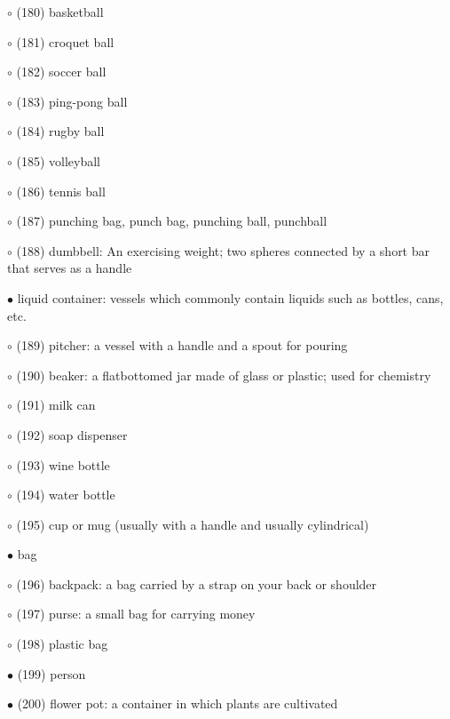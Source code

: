 \noindent \leftskip=0.5cm $\circ$ (180) basketball

\noindent \leftskip=0.5cm $\circ$ (181) croquet ball

\noindent \leftskip=0.5cm $\circ$ (182) soccer ball

\noindent \leftskip=0.5cm $\circ$ (183) ping-pong ball

\noindent \leftskip=0.5cm $\circ$ (184) rugby ball

\noindent \leftskip=0.5cm $\circ$ (185) volleyball

\noindent \leftskip=0.5cm $\circ$ (186) tennis ball

\noindent \leftskip=0.25cm $\circ$ (187) punching bag, punch bag, punching ball, punchball

\noindent \leftskip=0.25cm $\circ$ (188) dumbbell: An exercising weight; two spheres connected by a short bar that serves as a handle

\noindent \leftskip=0.0cm $\bullet$ liquid container: vessels which commonly contain liquids such as bottles, cans, etc.

\noindent \leftskip=0.25cm $\circ$ (189) pitcher: a vessel with a handle and a spout for pouring

\noindent \leftskip=0.25cm $\circ$ (190) beaker: a flatbottomed jar made of glass or plastic; used for chemistry

\noindent \leftskip=0.25cm $\circ$ (191) milk can

\noindent \leftskip=0.25cm $\circ$ (192) soap dispenser

\noindent \leftskip=0.25cm $\circ$ (193) wine bottle

\noindent \leftskip=0.25cm $\circ$ (194) water bottle

\noindent \leftskip=0.25cm $\circ$ (195) cup or mug (usually with a handle and usually cylindrical)

\noindent \leftskip=0.0cm $\bullet$ bag

\noindent \leftskip=0.25cm $\circ$ (196) backpack: a bag carried by a strap on your back or shoulder

\noindent \leftskip=0.25cm $\circ$ (197) purse: a small bag for carrying money

\noindent \leftskip=0.25cm $\circ$ (198) plastic bag

\noindent \leftskip=0.0cm $\bullet$ (199) person

\noindent \leftskip=0.0cm $\bullet$ (200) flower pot: a container in which plants are cultivated

